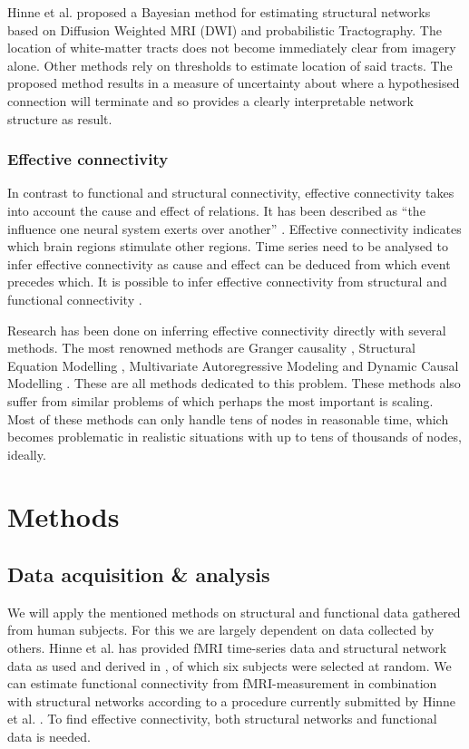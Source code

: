 \documentclass[a4paper, 10pt, english, twocolumn]{article}
\begin{document}
Hinne et al. \cite{hinne2013} proposed a Bayesian method for estimating structural networks based on Diffusion Weighted MRI (DWI) and probabilistic Tractography.
The location of white-matter tracts does not become immediately clear from imagery alone.
Other methods rely on thresholds to estimate location of said tracts.
The proposed method results in a measure of uncertainty about where a hypothesised connection will terminate and so provides a clearly interpretable network structure as result.

\subsubsection*{Effective connectivity}
In contrast to functional and structural connectivity, effective connectivity takes into account the cause and effect of relations.
It has been described as ``the influence one neural system exerts over another'' \cite{friston1994}.
Effective connectivity indicates which brain regions stimulate other regions.
Time series need to be analysed to infer effective connectivity as cause and effect can be deduced from which event precedes which. 
It is possible to infer effective connectivity from structural and functional connectivity \cite{mclntosh1994, harrison2003, friston2003, roebroeck2005}.

Research has been done on inferring effective connectivity directly with several methods.
The most renowned methods are Granger causality \cite{roebroeck2005}, Structural Equation Modelling \cite{mclntosh1994}, Multivariate Autoregressive Modeling \cite{harrison2003} and Dynamic Causal Modelling \cite{friston2003}.
These are all methods dedicated to this problem.
These methods also suffer from similar problems of which perhaps the most important is scaling.
Most of these methods can only handle tens of nodes in reasonable time, which becomes problematic in realistic situations with up to tens of thousands of nodes, ideally.


\section{Methods}

\subsection*{Data acquisition \& analysis}
We will apply the mentioned methods on structural and functional data gathered from human subjects.
For this we are largely dependent on data collected by others.
Hinne et al. has provided fMRI time-series data and structural network data as used and derived in \cite{hinne2013}, of which six subjects were selected at random.
We can estimate functional connectivity from fMRI-measurement in combination with structural 
networks according to a procedure currently submitted by Hinne et al. \cite{hinne2013submitted}.
To find effective connectivity, both structural networks and functional data is needed.
\end{document}
